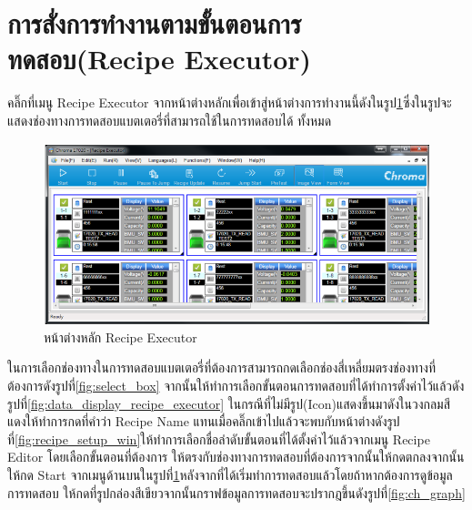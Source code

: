 \section{การสั่งการทำงานตามขั้นตอนการทดสอบ(Recipe Executor)}
คลิ๊กที่เมนู Recipe Executor จากหน้าต่างหลักเพื่อเข้าสู่หน้าต่างการทำงานนี้ดังในรูป\ref{fig:main_Recipe_Executor}ซึ่งในรูปจะแสดงช่องทางการทดสอบแบตเตอรี่ที่สามารถใช้ในการทดสอบได้
ทั้งหมด
\begin{center}
	\begin{figure}[H]
		\includegraphics[width=1\linewidth]{Chapters/img/17020_Program/Recipe_Executor/Recipe_executor_main_win.png}
		\centering
		\captionsetup{justification=centering,margin=2cm}
		\caption{หน้าต่างหลัก Recipe Executor}
		\label{fig:main_Recipe_Executor}
	\end{figure}
\end{center}
ในการเลือกช่องทางในการทดสอบแบตเตอรี่ที่ต้องการสามารถกดเลือกช่องสี่เหลี่ยมตรงช่องทางที่ต้องการดังรูปที่\ref{fig:select_box} จากนั้นให้ทำการเลือกขั้นตอนการทดสอบที่ได้ทำการตั้งค่าไว้แล้วดังรูปที่\ref{fig:data_display_recipe_executor} ในกรณีที่ไม่มีรูป(Icon)แสดงขึ้นมาดังในวงกลมสีแดงให้ทำการกดที่คำว่า Recipe Name แทนเมื่อคลิ๊กเข้าไปแล้วจะพบกับหน้าต่างดังรูปที่\ref{fig:recipe_setup_win}ให้ทำการเลือกชื่อลำดับขั้นตอนที่ได้ตั้งค่าไว้แล้วจากเมนู Recipe Editor โดยเลือกขั้นตอนที่ต้องการ
ให้ตรงกับช่องทางการทดสอบที่ต้องการจากนั้นให้กดตกลงจากนั้นให้กด Start จากเมนูด้านบนในรูปที่\ref{fig:main_Recipe_Executor}หลังจากที่ได้เริ่มทำการทดสอบแล้วโดยถ้าหากต้องการดูข้อมูลการทดสอบ
ให้กดที่รูปกล่องสีเขียวจากนั้นกราฟข้อมูลการทดสอบจะปรากฎขึ้นดังรูปที่\ref{fig:ch_graph}

